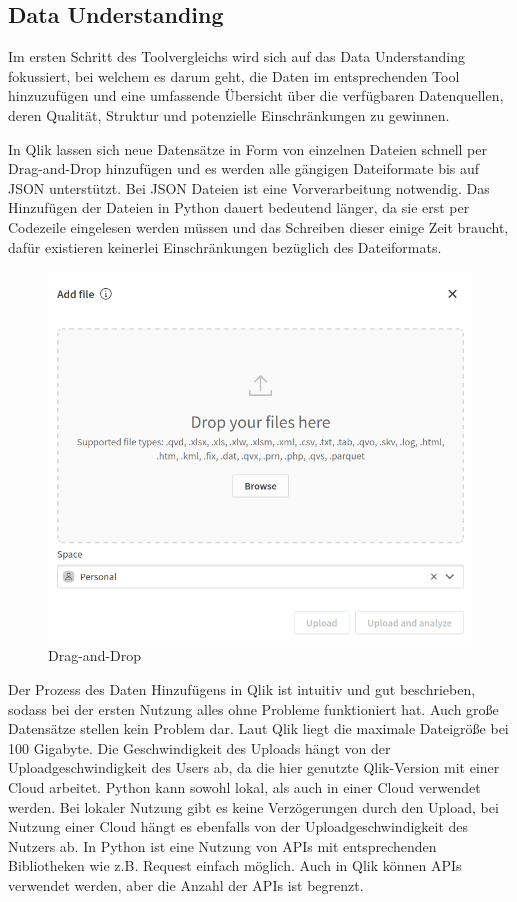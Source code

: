 \documentclass[12pt]{article}
\begin{document}
	\subsection{Data Understanding}
	Im ersten Schritt des Toolvergleichs wird sich auf das Data Understanding fokussiert, bei welchem es darum geht, die Daten im entsprechenden Tool hinzuzufügen und eine umfassende Übersicht über die verfügbaren Datenquellen, deren Qualität, Struktur und potenzielle Einschränkungen zu gewinnen.

	In Qlik lassen sich neue Datensätze in Form von einzelnen Dateien schnell per Drag-and-Drop hinzufügen und es werden alle gängigen Dateiformate bis auf JSON unterstützt. Bei JSON Dateien ist eine Vorverarbeitung notwendig. Das Hinzufügen der Dateien in Python dauert bedeutend länger, da sie erst per Codezeile eingelesen werden müssen und das Schreiben dieser einige Zeit braucht, dafür existieren keinerlei Einschränkungen bezüglich des Dateiformats.
	\begin{figure}[h]
		\centering
		\includegraphics[width=1.0\textwidth]{dragndrop}
		\caption{Drag-and-Drop}
	\end{figure}
	
	Der Prozess des Daten Hinzufügens in Qlik ist intuitiv und gut beschrieben, sodass bei der ersten Nutzung alles ohne Probleme funktioniert hat. Auch große Datensätze stellen kein Problem dar. Laut Qlik liegt die maximale Dateigröße bei 100 Gigabyte. Die Geschwindigkeit des Uploads hängt von der Uploadgeschwindigkeit des Users ab, da die hier genutzte Qlik-Version mit einer Cloud arbeitet. Python kann sowohl lokal, als auch in einer Cloud verwendet werden. Bei lokaler Nutzung gibt es keine Verzögerungen durch den Upload, bei Nutzung einer Cloud hängt es ebenfalls von der Uploadgeschwindigkeit des Nutzers ab.
	In Python ist eine Nutzung von APIs mit entsprechenden Bibliotheken wie z.B. Request einfach möglich.
	Auch in Qlik können APIs verwendet werden, aber die Anzahl der APIs ist begrenzt.
	
\end{document}
